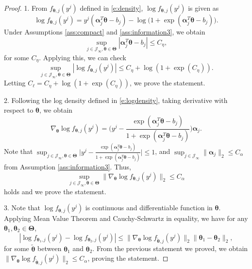 \documentclass[12pt]{article}
\newcommand{\bfTheta}{\boldsymbol{\Theta}}
\newcommand{\bfalpha}{\boldsymbol{\alpha}}
\newcommand{\bftheta}{\boldsymbol{\theta}}
\begin{document}
\begin{proof}
1. From $f_{\bftheta, j}(y^j)$ defined in \eqref{e:density}, $\log f_{\bftheta, j}(y^j)$ is given as
\begin{equation} \label{e:logdensity}
\log f_{\bftheta, j}(y^j) = y^j (\bfalpha_j^T \bftheta - b_j) - \log \Big( 1 + \exp( \bfalpha_j^T \bftheta - b_j )\Big).
\end{equation}
Under Assumptions \ref{ass:compact} and \ref{ass:information3}, we obtain 
\begin{equation*}
\sup_{j \in \mathcal{J}_{\infty}, \bftheta \in \bfTheta} |\bfalpha_j^T \bftheta - b_j| \le C_{\eta},
\end{equation*}
for some $C_{\eta}$. Applying this, we can check
\begin{equation*}
\sup_{j \in \mathcal{J}_{\infty}, \bftheta \in \bfTheta} | \log f_{\bftheta, j}(y^j) | \leq C_{\eta} + \log( 1 + \exp( C_\eta) ).
\end{equation*}
Letting $C_{\ell} = C_{\eta} + \log( 1 + \exp( C_\eta) )$, we prove the statement.

2. Following the log density defined in \eqref{e:logdensity}, taking derivative with respect to $\bftheta$, we obtain
\begin{equation} \label{e:logdenstiy_deriv}
\nabla_{\bftheta} \log f_{\bftheta,j}(y^j) = \Big( y^j - \frac{\exp(\bfalpha_j^T \bftheta - b_j)}{1 + \exp(\bfalpha_j^T \bftheta - b_j)} \Big) \bfalpha_j.
\end{equation}
Note that $\sup_{j \in \mathcal{J}_{\infty}, \bftheta \in \bfTheta} \Big| y^j - \frac{\exp(\bfalpha_j^T \bftheta - b_j)}{1 + \exp(\bfalpha_j^T \bftheta - b_j)} \Big| \le 1$, and $\sup_{j \in \mathcal{J}_{\infty}} \|\bfalpha_j \|_2 \leq C_{\alpha}$ from Assumption \ref{ass:information3}. Thus, 
\begin{equation*}
\sup_{j \in \mathcal{J}_{\infty}, \bftheta \in \bfTheta} \| \nabla_{\bftheta} \log f_{\bftheta, j}(y^j) \|_2 \le C_{\alpha}
\end{equation*}
holds and we prove the statement.

3. Note that $\log f_{\bftheta, j}(y^j)$ is continuous and differentiable function in $\bftheta$. Applying Mean Value Theorem and Cauchy-Schwartz in equality, we have for any $\bftheta_1, \bftheta_2 \in \bfTheta$,
\begin{equation*}
| \log f_{\bftheta_1, j}(y^j) - \log f_{\bftheta_2, j}(y^j) | \le \| \nabla_{\bftheta} \log f_{\tilde{\bftheta}, j}(y^j) \|_2 \| \bftheta_1 - \bftheta_2 \|_2,
\end{equation*}
for some $\tilde{\bftheta}$ between $\bftheta_1$ and $\bftheta_2$. From the previous statement we proved, we obtain $\| \nabla_{\bftheta} \log f_{\tilde{\bftheta}, j}(y^j) \|_2 \le C_{\alpha}$, proving the statement.


\end{proof}
\end{document}
